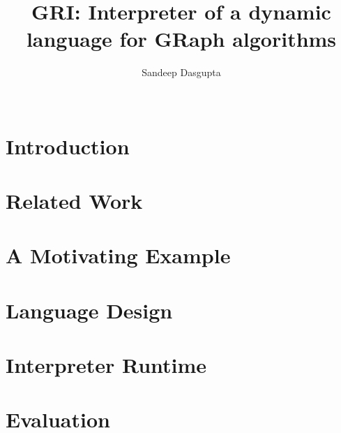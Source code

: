\documentclass{sig-alternate}
\begin{document}
\title{GRI: Interpreter of a dynamic language for GRaph algorithms}

%
\author{
\alignauthor Sandeep Dasgupta\\ \\  } \date{}

\maketitle 




\section{Introduction}



\section{Related Work}\label{sec:bgrel}


\section{A Motivating Example}\label{sec:motiv}


\section{Language Design}\label{sec:language}


\section{Interpreter Runtime}\label{sec:runtime}


\section{Evaluation}\label{sec:eval}




  
\end{document}

